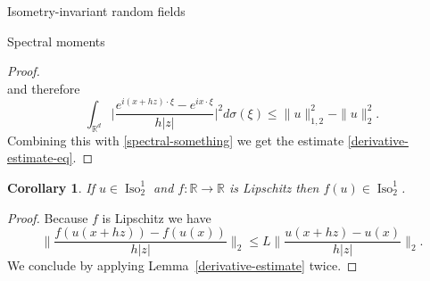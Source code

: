 \documentclass[a4paper,10pt,fleqn]{amsart}
\newtheorem{corollary}[theorem]{Corollary}
\theoremstyle{remark}
\theoremstyle{definition}
\DeclareMathOperator{\Iso}{Iso}
\newcommand{\X} {{\mathbb{R}^d}}
\newcommand{\R} {\mathbb{R}}
\renewcommand{\=} {\overset{d}{=}}
\begin{document}
\begin{section}{Isometry-invariant random fields}
\begin{subsection}{Spectral moments}
\begin{proof}
\begin{equation*}
      \end{equation*}
      and therefore
      \begin{equation*}
       \int_\X\Big|\frac{e^{i(x+hz)\cdot\xi}-e^{ix\cdot\xi}}{h|z|}\Big|^2d\sigma(\xi)
       \leq \|u\|_{1,2}^2- \|u\|_{2}^2.
      \end{equation*}
      Combining this with \eqref{spectral-something} we get the estimate \eqref{derivative-estimate-eq}.
    \end{proof}
    \begin{corollary}\label{lipschitz}
     If $u\in\Iso^1_2$ and $f:\R\to\R$ is Lipschitz then $f(u)\in\Iso^1_2$.
    \end{corollary}
    \begin{proof}
    Because $f$ is Lipschitz we have
    \begin{equation*}
      \Big\|\frac{f(u(x+hz))-f(u(x))}{h|z|}\Big\|_2 \leq L \Big\|\frac{u(x+hz)-u(x)}{h|z|}\Big\|_2.
    \end{equation*}
    We conclude by applying Lemma~\ref{derivative-estimate} twice.
    \end{proof}
  \end{subsection}
    \end{section}
\end{document}
